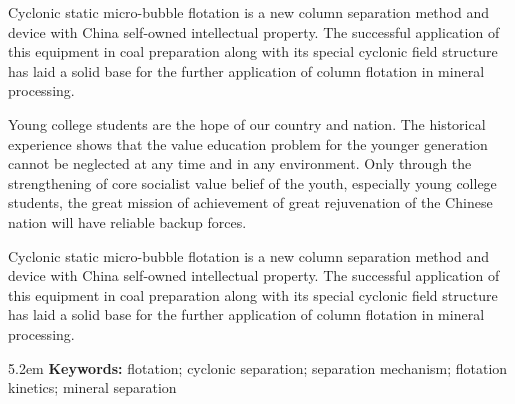 \begin{enabstract}
	Cyclonic static micro-bubble flotation is a new column separation method and device with China self-owned intellectual property.  The successful application of this equipment in coal preparation along with its special cyclonic field structure has laid a solid base for the further application of column flotation in mineral processing.\par
	Young college students are the hope of our country and nation. The historical experience shows that the value education problem for the younger generation cannot be neglected at any time and in any environment. Only through the strengthening of core socialist value belief of the youth, especially young college students, the great mission of achievement of great rejuvenation of the Chinese nation will have reliable backup forces. \par 
	
	Cyclonic static micro-bubble flotation is a new column separation method and device with China self-owned intellectual property.  The successful application of this equipment in coal preparation along with its special cyclonic field structure has laid a solid base for the further application of column flotation in mineral processing.\par
	
	\hangindent 5.2em 
	{\noindent \textbf{Keywords:}} flotation; cyclonic separation; separation mechanism; flotation kinetics; mineral separation \par
\end{enabstract}